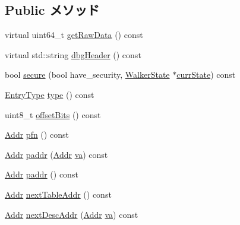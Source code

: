 \subsection*{Public メソッド}
\begin{DoxyCompactItemize}
\item 
virtual uint64\_\-t \hyperlink{classArmISA_1_1TableWalker_1_1LongDescriptor_a22438a8aab2360360239d433b2f8fc50}{getRawData} () const 
\item 
virtual std::string \hyperlink{classArmISA_1_1TableWalker_1_1LongDescriptor_ac7721f9b49eadf35e0a9f7715a346dbe}{dbgHeader} () const 
\item 
bool \hyperlink{classArmISA_1_1TableWalker_1_1LongDescriptor_a183500f0404847b8d9ea66ef3cba6ca5}{secure} (bool have\_\-security, \hyperlink{classArmISA_1_1TableWalker_1_1WalkerState}{WalkerState} $\ast$\hyperlink{classArmISA_1_1TableWalker_a5d1a85a0248e318a8191d54988c8782d}{currState}) const 
\item 
\hyperlink{classArmISA_1_1TableWalker_1_1LongDescriptor_a9ed8d16c9ae7fae285dd2146c3159023}{EntryType} \hyperlink{classArmISA_1_1TableWalker_1_1LongDescriptor_afeee2b784cb2b021c06cdde9c98130d0}{type} () const 
\item 
uint8\_\-t \hyperlink{classArmISA_1_1TableWalker_1_1LongDescriptor_ae34090e6c4584fabe4d885ae7b2e31d0}{offsetBits} () const 
\item 
\hyperlink{classm5_1_1params_1_1Addr}{Addr} \hyperlink{classArmISA_1_1TableWalker_1_1LongDescriptor_ae6bfcb957f6df6777f3294e78ac298af}{pfn} () const 
\item 
\hyperlink{classm5_1_1params_1_1Addr}{Addr} \hyperlink{classArmISA_1_1TableWalker_1_1LongDescriptor_a4fd8dbd54f4412ba92edbf632940c8de}{paddr} (\hyperlink{classm5_1_1params_1_1Addr}{Addr} \hyperlink{namespaceArmISA_a441099e13f407fadb6bcb0447107de87}{va}) const 
\item 
\hyperlink{classm5_1_1params_1_1Addr}{Addr} \hyperlink{classArmISA_1_1TableWalker_1_1LongDescriptor_a26f24be1556c1c0ac2c42e1eff5e1197}{paddr} () const 
\item 
\hyperlink{classm5_1_1params_1_1Addr}{Addr} \hyperlink{classArmISA_1_1TableWalker_1_1LongDescriptor_a69898330efaf097540fa36f1f94b5c41}{nextTableAddr} () const 
\item 
\hyperlink{classm5_1_1params_1_1Addr}{Addr} \hyperlink{classArmISA_1_1TableWalker_1_1LongDescriptor_a0464bb8a36a7df5b95a949f1cdb5d68c}{nextDescAddr} (\hyperlink{classm5_1_1params_1_1Addr}{Addr} \hyperlink{namespaceArmISA_a441099e13f407fadb6bcb0447107de87}{va}) const 

\end{DoxyCompactItemize}
